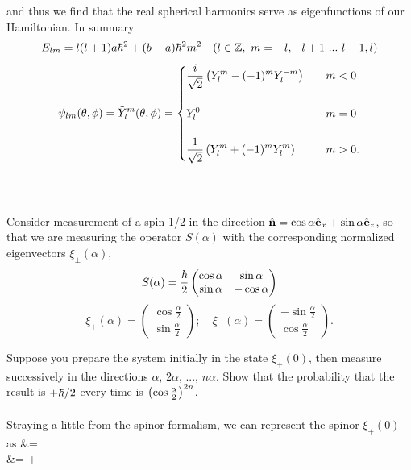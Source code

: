 \documentclass[11pt,letterpaper]{article}
\begin{document}
		and thus we find that the real spherical harmonics serve as eigenfunctions of our Hamiltonian. In summary
		\[
			E_{lm}= l(l+1)a\hbar^2 +(b-a)\hbar^2m^2\quad (l\in \mathbb{Z},\ m=-l,-l+1\  ...\  l-1,l)
		\]
		\[
			\psi_{lm}(\theta,\phi) = \tilde Y_l^m(\theta,\phi) = \begin{cases} \displaystyle  \frac{i}{\sqrt 2}\left(Y_l^m-(-1)^mY^{-m}_l\right)&\quad m<0\\ \\
			\displaystyle Y_l^0&\quad m=0\\ \\
			\displaystyle  \frac{1}{\sqrt 2}\left(Y_l^{m}+(-1)^mY^{m}_l\right)&\quad m>0.
			\end{cases}
		\]
		\\
		\\
		\eenum
		
	
	\item
	Consider measurement of a spin 1/2 in the direction $\hat{\mathbf{n}} = \cos\alpha \hat{\mathbf{e}}_x+\sin\alpha\hat{\mathbf{e}}_z$, so that
	we are measuring the operator $S(\alpha)$ with the corresponding normalized eigenvectors $\xi_\pm(\alpha)$,
	\[
		S(\alpha) = \frac{\hbar}{2}
		\begin{pmatrix} \cos\alpha&\sin\alpha\\\sin\alpha &-\cos\alpha
		\end{pmatrix}
	\]
	\[
		\xi_+(\alpha) = \begin{pmatrix}\cos \frac \alpha2 \\ \sin \frac \alpha2 \end{pmatrix};\quad
		\xi_-(\alpha) = \begin{pmatrix}-\sin\frac \alpha2 \\ \cos \frac \alpha 2 \end{pmatrix}.
	\]	
		\benum
		\item
		Suppose you prepare the system initially in the state $\xi_+(0)$, then measure successively in the directions $\alpha$, $2
		\alpha$, ..., $n\alpha$. Show that the probability that the result is $+\hbar/2$ every time is $\left(\cos \frac \alpha2\right)^{2n}$.
		\\
		\\
		Straying a little from the spinor formalism, we can represent the spinor
		$\xi_+(0)$ as
		\ba
			 &=  \\
			&= \ket +\\
\end{document}
